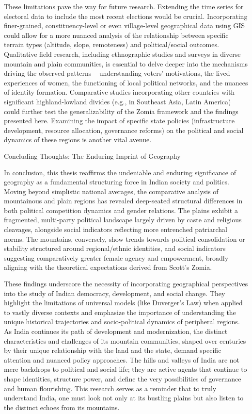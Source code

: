 \begin{sloppypar}
These limitations pave the way for future research. Extending the time series for electoral data to include the most recent elections would be crucial. Incorporating finer-grained, constituency-level or even village-level geographical data using GIS could allow for a more nuanced analysis of the relationship between specific terrain types (altitude, slope, remoteness) and political/social outcomes. Qualitative field research, including ethnographic studies and surveys in diverse mountain and plain communities, is essential to delve deeper into the mechanisms driving the observed patterns – understanding voters' motivations, the lived experiences of women, the functioning of local political networks, and the nuances of identity formation. Comparative studies incorporating other countries with significant highland-lowland divides (e.g., in Southeast Asia, Latin America) could further test the generalizability of the Zomia framework and the findings presented here. Examining the impact of specific state policies (infrastructure development, resource allocation, governance reforms) on the political and social dynamics of these regions is another vital avenue.

Concluding Thoughts: The Enduring Imprint of Geography

In conclusion, this thesis reaffirms the undeniable and enduring significance of geography as a fundamental structuring force in Indian society and politics. Moving beyond simplistic national averages, the comparative analysis of mountainous and plain regions has revealed deep-seated structural differences in both political competition dynamics and gender relations. The plains exhibit a fragmented, multi-party political landscape largely driven by caste and religious cleavages, alongside social indicators reflecting more entrenched patriarchal norms. The mountains, conversely, show trends towards political consolidation or stability structured around regional/ethnic identities, and social indicators suggesting comparatively greater female agency and empowerment, broadly aligning with the theoretical expectations derived from Scott's Zomia.

These findings underscore the necessity of incorporating geographical perspectives into the study of Indian democracy, development, and social change. They highlight the limitations of universal models (like Duverger's Law) when applied to vastly diverse contexts and emphasize the importance of understanding the unique historical trajectories and socio-political dynamics of peripheral regions. As India continues its path of development and modernization, the distinct characteristics and challenges of its mountain communities, shaped over centuries by their unique relationship with the land and the state, demand specific attention and nuanced policy approaches. The hills and valleys of India are not mere backdrops to political and social life; they are active agents that continue to shape identities, structure power, and define the very possibilities of governance and human flourishing. This research serves as a reminder that to truly understand India, one must look not only at its bustling plains but also listen to the distinct echoes from its mountains.

\end{sloppypar}